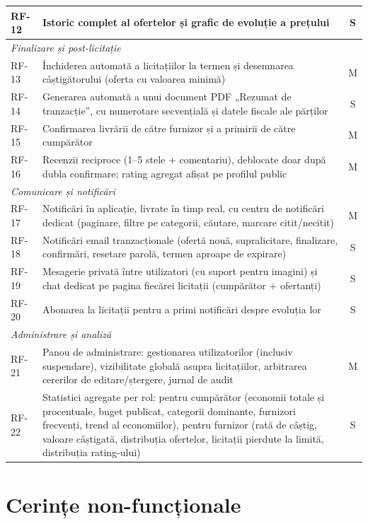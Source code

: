 \begin{table}[!ht]
\begin{tabular}{l >{\raggedright\arraybackslash}p{11.2cm} c}
RF-12 & Istoric complet al ofertelor și grafic de evoluție a prețului & S \\
\midrule
\multicolumn{3}{l}{\textit{Finalizare și post-licitație}} \\
RF-13 & Închiderea automată a licitațiilor la termen și desemnarea câștigătorului (oferta cu valoarea minimă) & M \\
RF-14 & Generarea automată a unui document PDF „Rezumat de tranzacție'', cu numerotare secvențială și datele fiscale ale părților & S \\
RF-15 & Confirmarea livrării de către furnizor și a primirii de către cumpărător & M \\
RF-16 & Recenzii reciproce (1--5 stele + comentariu), deblocate doar după dubla confirmare; rating agregat afișat pe profilul public & M \\
\midrule
\multicolumn{3}{l}{\textit{Comunicare și notificări}} \\
RF-17 & Notificări în aplicație, livrate în timp real, cu centru de notificări dedicat (paginare, filtre pe categorii, căutare, marcare citit/necitit) & M \\
RF-18 & Notificări email tranzacționale (ofertă nouă, supralicitare, finalizare, confirmări, resetare parolă, termen aproape de expirare) & S \\
RF-19 & Mesagerie privată între utilizatori (cu suport pentru imagini) și chat dedicat pe pagina fiecărei licitații (cumpărător + ofertanți) & S \\
RF-20 & Abonarea la licitații pentru a primi notificări despre evoluția lor & S \\
\midrule
\multicolumn{3}{l}{\textit{Administrare și analiză}} \\
RF-21 & Panou de administrare: gestionarea utilizatorilor (inclusiv suspendare), vizibilitate globală asupra licitațiilor, arbitrarea cererilor de editare/ștergere, jurnal de audit & M \\
RF-22 & Statistici agregate per rol: pentru cumpărător (economii totale și procentuale, buget publicat, categorii dominante, furnizori frecvenți, trend al economiilor), pentru furnizor (rată de câștig, valoare câștigată, distribuția ofertelor, licitații pierdute la limită, distribuția rating-ului) & S \\
\bottomrule
\end{tabular}
\end{table}

\section{Cerințe non-funcționale}

